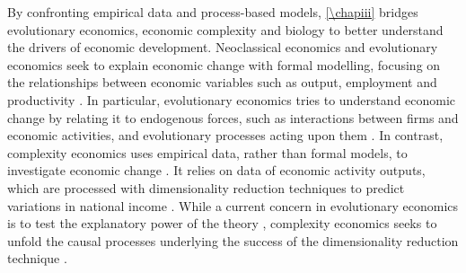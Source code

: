 % 
By confronting empirical data and process-based models, \cref{\chapiii} bridges evolutionary economics, economic complexity and biology to better understand the drivers of economic development.
% 
% 
% 
Neoclassical economics and evolutionary economics seek to explain economic change with formal modelling, focusing on the relationships between economic variables such as output, employment and productivity \citep{Boschma2005a}.
% 
% 
In particular, evolutionary economics tries to understand economic change by relating it to endogenous forces, such as interactions between firms and economic activities, and evolutionary processes acting upon them \citep{Hodgson2019,Metcalfe2006}.
% 
% 
In contrast, complexity economics uses empirical data, rather than formal models, to investigate economic change \citep{Hidalgo2021}. It relies on data of economic activity outputs, which are processed with dimensionality reduction techniques to predict variations in national income \citep{Mitchell}. 
% 
%
While a current concern in evolutionary economics is to test the explanatory power of the theory \cite{Hodgson2019}, complexity economics seeks to unfold the causal processes underlying the success of the dimensionality reduction technique \citep{Hidalgo2021}.


